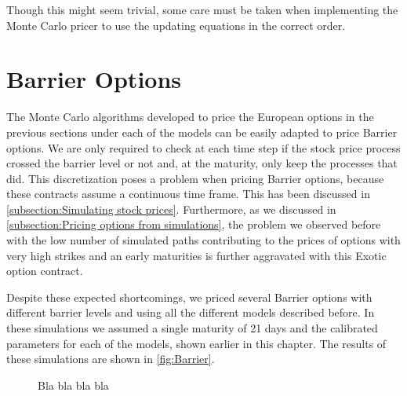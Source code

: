 Though this might seem trivial, some care must be taken when implementing the Monte Carlo pricer to use the updating equations in the correct order.

\section{Barrier Options}

The Monte Carlo algorithms developed to price the European options in the previous sections under each of the models can be easily adapted to price Barrier options.
We are only required to check at each time step if the stock price process crossed the barrier level or not and, at the maturity, only keep the processes that did. This discretization poses a problem when pricing Barrier options, because these contracts assume a continuous time frame. This has been discussed in \autoref{subsection:Simulating stock prices}. Furthermore, as we discussed in \autoref{subsection:Pricing options from simulations}, the problem we observed before with the low number of simulated paths contributing to the prices of options with very high strikes and an early maturities is further aggravated with this Exotic option contract.

Despite these expected shortcomings, we priced several Barrier options with different barrier levels and using all the different models described before. In these simulations we assumed a single maturity of 21 days and the calibrated parameters for each of the models, shown earlier in this chapter. The results of these simulations are shown in \autoref{fig:Barrier}.

\begin{figure}[H]
  \begin{subfigmatrix}{2}
  \end{subfigmatrix}
    \caption[Bla bla bla bla]{Bla bla bla bla}\label{fig:Barrier}
\end{figure} 

\newpage



